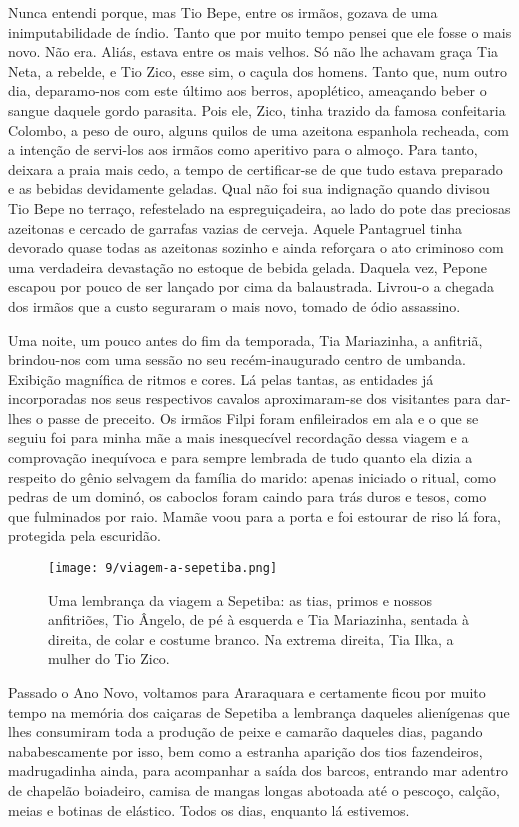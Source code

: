 Nunca entendi porque, mas Tio Bepe, entre os irmãos, gozava de uma inimputabilidade de índio.
Tanto que por muito tempo pensei que ele fosse o mais novo.
Não era.
Aliás, estava entre os mais velhos.
Só não lhe achavam graça Tia Neta, a rebelde, e Tio Zico, esse sim, o caçula dos homens.
Tanto que, num outro dia, deparamo-nos com este último aos berros, apoplético, ameaçando beber o sangue daquele gordo parasita.
Pois ele, Zico, tinha trazido da famosa confeitaria Colombo, a peso de ouro, alguns quilos de uma azeitona espanhola recheada, com a intenção de servi-los aos irmãos como aperitivo para o almoço.
Para tanto, deixara a praia mais cedo, a tempo de certificar-se de que tudo estava preparado e as bebidas devidamente geladas.
Qual não foi sua indignação quando divisou Tio Bepe no terraço, refestelado na espreguiçadeira, ao lado do pote das preciosas azeitonas e cercado de garrafas vazias de cerveja.
Aquele Pantagruel tinha devorado quase todas as azeitonas sozinho e ainda reforçara o ato criminoso com uma verdadeira devastação no estoque de bebida gelada.
Daquela vez, Pepone escapou por pouco de ser lançado por cima da balaustrada.
Livrou-o a chegada dos irmãos que a custo seguraram o mais novo, tomado de ódio assassino.

Uma noite, um pouco antes do fim da temporada, Tia Mariazinha, a anfitriã, brindou-nos com uma sessão no seu recém-inaugurado centro de umbanda.
Exibição magnífica de ritmos e cores.
Lá pelas tantas, as entidades já incorporadas nos seus respectivos cavalos aproximaram-se dos visitantes para dar-lhes o passe de preceito.
Os irmãos Filpi foram enfileirados em ala e o que se seguiu foi para minha mãe a mais inesquecível recordação dessa viagem e a comprovação inequívoca e para sempre lembrada de tudo quanto ela dizia a respeito do gênio selvagem da família do marido: apenas iniciado o ritual, como pedras de um dominó, os caboclos foram caindo para trás duros e tesos, como que fulminados por raio.
Mamãe voou para a porta e foi estourar de riso lá fora, protegida pela escuridão.

\begin{figure}[H]
\centering
\texttt{[image: 9/viagem-a-sepetiba.png]}
\caption{Uma lembrança da viagem a Sepetiba: as tias, primos e nossos anfitriões, Tio Ângelo, de pé à esquerda e Tia Mariazinha, sentada à direita, de colar e costume branco.
Na extrema direita, Tia Ilka, a mulher do Tio Zico.}
\end{figure}


Passado o Ano Novo, voltamos para Araraquara e certamente ficou por muito tempo na memória dos caiçaras de Sepetiba a lembrança daqueles alienígenas que lhes consumiram toda a produção de peixe e camarão daqueles dias, pagando nababescamente por isso, bem como a estranha aparição dos tios fazendeiros, madrugadinha ainda, para acompanhar a saída dos barcos, entrando mar adentro de chapelão boiadeiro, camisa de mangas longas abotoada até o pescoço, calção, meias e botinas de elástico.
Todos os dias, enquanto lá estivemos.

